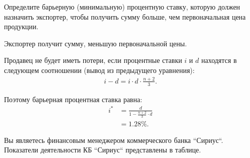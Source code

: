 \documentclass[12pt, table]{exam}
\begin{document}
\begin{questions}
\begin{subparts}
	Определите барьерную (минимальную) процентную ставку, которую должен назначить экспортер, чтобы получить сумму больше, чем первоначальная цена продукции.
	
	\begin{solution}[6em]
		
		Экспортер получит сумму, меньшую первоначальной цены. 
		
		Продавец не будет иметь потери, если процентные ставки $i$ и $d$ находятся в следующем соотношении (вывод из предыдущего уравнения):
		\begin{align}
		i-d=i \cdot d \cdot \frac{n+2}{3}.
		\end{align}
		
		Поэтому барьерная процентная ставка равна:
		\begin{align}
		i^*&=\frac{d}{1-\frac{n+2}{3} \cdot d}\\
		&=1.28\%.\nonumber
		\end{align}
		
	\end{solution}
\end{subparts}
\addpoints

\pagebreak
\question[20] Вы являетесь финансовым менеджером коммерческого банка ``Сириус``. 
Показатели деятельности КБ ``Сириус`` представлены в таблице.


\end{questions}
\end{document}
